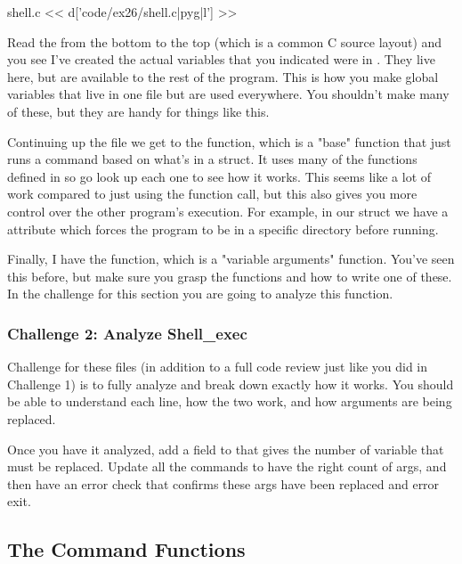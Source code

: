 \begin{code}{shell.c}
<< d['code/ex26/shell.c|pyg|l'] >>
\end{code}

Read the  from the bottom to the top (which is a common C source
layout) and you see I've created the actual  variables that you
indicated were  in .  They live here, but are 
available to the rest of the program.  This is how you make global variables
that live in one  file but are used everywhere.  You shouldn't make
many of these, but they are handy for things like this.

Continuing up the file we get to the  function, which is
a "base" function that just runs a command based on what's in a 
struct.  It uses many of the functions defined in 
so go look up each one to see how it works.  This seems like a lot of work
compared to just using the  function call, but this also gives
you more control over the other program's execution.  For example, in our
 struct we have a  attribute which forces the program
to be in a specific directory before running.

Finally, I have the  function, which is a "variable arguments"
function.  You've seen this before, but make sure you grasp the 
functions and how to write one of these.  In the challenge for this section
you are going to analyze this function.

\subsubsection{Challenge 2: Analyze Shell\_exec}

Challenge for these files (in addition to a full code review just like you
did in Challenge 1) is to fully analyze  and break down
exactly how it works.  You should be able to understand each line, how
the two  work, and how arguments are being replaced.

Once you have it analyzed, add a field to  that gives
the number of variable  that must be replaced.  Update all the
commands to have the right count of args, and then have an error check that
confirms these args have been replaced and error exit.

\subsection{The Command Functions}

